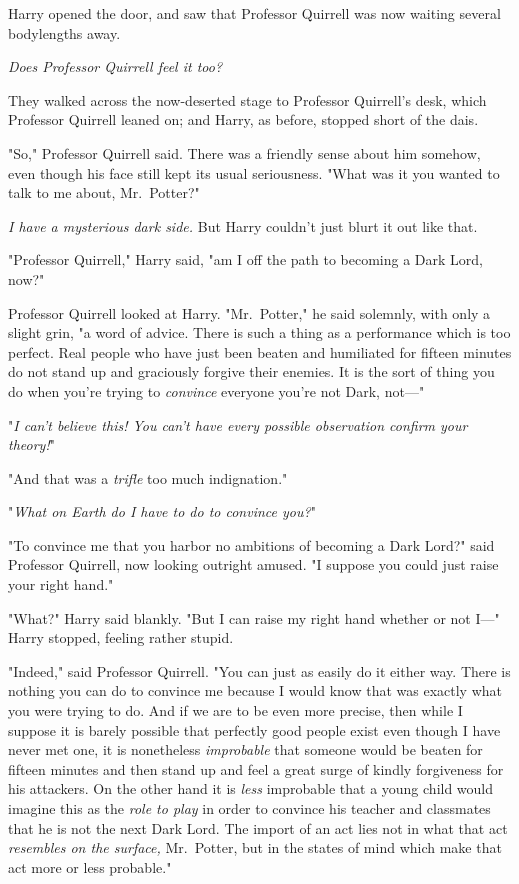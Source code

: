 Harry opened the door, and saw that Professor Quirrell was now waiting several bodylengths away.

\emph{Does Professor Quirrell feel it too?}

They walked across the now-deserted stage to Professor Quirrell's desk, which Professor Quirrell leaned on; and Harry, as before, stopped short of the dais.

"So," Professor Quirrell said. There was a friendly sense about him somehow, even though his face still kept its usual seriousness. "What was it you wanted to talk to me about, Mr.~Potter?"

\emph{I have a mysterious dark side.} But Harry couldn't just blurt it out like that.

"Professor Quirrell," Harry said, "am I off the path to becoming a Dark Lord, now?"

Professor Quirrell looked at Harry. "Mr.~Potter," he said solemnly, with only a slight grin, "a word of advice. There is such a thing as a performance which is too perfect. Real people who have just been beaten and humiliated for fifteen minutes do not stand up and graciously forgive their enemies. It is the sort of thing you do when you're trying to \emph{convince} everyone you're not Dark, not---"

"\emph{I can't believe this! You can't have every possible observation confirm your theory!}"

"And that was a \emph{trifle} too much indignation."

"\emph{What on Earth do I have to do to convince you?}"

"To convince me that you harbor no ambitions of becoming a Dark Lord?" said Professor Quirrell, now looking outright amused. "I suppose you could just raise your right hand."

"What?" Harry said blankly. "But I can raise my right hand whether or not I---" Harry stopped, feeling rather stupid.

"Indeed," said Professor Quirrell. "You can just as easily do it either way. There is nothing you can do to convince me because I would know that was exactly what you were trying to do. And if we are to be even more precise, then while I suppose it is barely possible that perfectly good people exist even though I have never met one, it is nonetheless \emph{improbable} that someone would be beaten for fifteen minutes and then stand up and feel a great surge of kindly forgiveness for his attackers. On the other hand it is \emph{less} improbable that a young child would imagine this as the \emph{role to play} in order to convince his teacher and classmates that he is not the next Dark Lord. The import of an act lies not in what that act \emph{resembles on the surface,} Mr.~Potter, but in the states of mind which make that act more or less probable."

